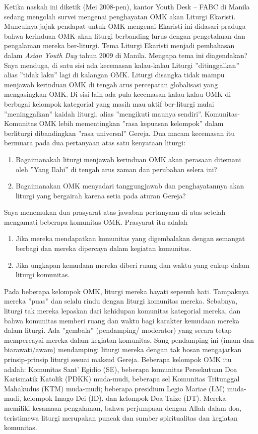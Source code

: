 Ketika naskah ini diketik (Mei 2008-pen), kantor Youth Desk – FABC di Manila sedang mengolah survei mengenai penghayatan OMK akan Liturgi Ekaristi. Munculnya jajak pendapat untuk OMK mengenai Ekaristi ini didasari praduga bahwa kerinduan OMK akan liturgi berbanding lurus dengan pengetahuan dan pengalaman mereka ber-liturgi.  Tema Liturgi Ekaristi menjadi pembahasan dalam \textit{Asian Youth Day} tahun  2009 di Manila.  Mengapa tema ini diagendakan? Saya menduga, di satu sisi ada kecemasan kalau-kalau  Liturgi  ”ditinggalkan” alias ”tidak laku” lagi di kalangan OMK. Liturgi disangka tidak mampu menjawab kerinduan OMK di tengah arus percepatan globalisasi yang mengasingkan OMK. Di sisi lain ada pula kecemasan kalau-kalau  OMK di berbagai kelompok kategorial yang masih mau aktif ber-liturgi  mulai ”meninggalkan” kaidah liturgi, alias ”mengikuti maunya sendiri”. Komunitas-Komunitas OMK  lebih mementingkan ”rasa kepuasan kelompok” dalam berliturgi dibandingkan ”rasa universal” Gereja. Dua macam kecemasan itu bermuara pada dua pertanyaan atas satu kenyataan liturgi: 
\begin{enumerate}
\item Bagaimanakah liturgi menjawab kerinduan OMK akan perasaan ditemani oleh ”Yang Ilahi” di tengah arus zaman dan perubahan selera ini? \item Bagaimanakan OMK menyadari tanggungjawab dan penghayatannya akan liturgi yang bergairah karena setia pada aturan Gereja?
\end{enumerate}

Saya menemukan dua prasyarat atas jawaban pertanyaan di atas setelah mengamati beberapa komunitas OMK.  Prasyarat itu adalah 
\begin{enumerate}
\item Jika mereka mendapatkan komunitas yang digembalakan dengan semangat berbagi dan mereka dipercaya dalam kegiatan komunitas. 
\item Jika ungkapan kemudaan mereka diberi ruang dan waktu yang cukup dalam liturgi komunitas.
\end{enumerate}

Pada beberapa kelompok OMK, liturgi mereka hayati sepenuh hati. Tampaknya mereka ”puas” dan selalu rindu dengan liturgi komunitas mereka.  Sebabnya, liturgi tak mereka lepaskan  dari kehidupan komunitas kategorial mereka, dan bahwa komunitas memberi ruang dan waktu bagi karakter kemudaan mereka dalam liturgi. Ada ”gembala” (pendamping/ moderator) yang secara tetap mempercayai mereka dalam kegiatan komunitas. Sang pendamping ini (imam dan biarawati/awam) mendampingi liturgi mereka dengan tak bosan mengajarkan prinsip-prinsip  liturgi  sesuai  maksud Gereja. Beberapa kelompok OMK itu adalah: Komunitas Sant’ Egidio (SE), beberapa komunitas Persekutuan Doa Karismatik Katolik (PDKK) muda-mudi, beberapa sel Komunitas  Tritunggal Mahakudus (KTM) muda-mudi; beberapa presidium Legio Mariae (LM) muda-mudi, kelompok Imago Dei (ID), dan kelompok Doa Taize (DT). Mereka memiliki kesamaan pengalaman, bahwa perjumpaan dengan Allah dalam doa, teristimewa liturgi merupakan puncak dan sumber spiritualitas dan kegiatan komunitas.

